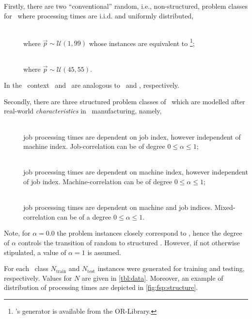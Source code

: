 Firstly, there are two ``conventional'' random, i.e., non-structured, problem classes for \FSP\  where processing times are i.i.d. and uniformly distributed, 
\begin{description}
	\item[\Frnd]   \hfill \\
	where $\vec{p}\sim\mathcal{U}(1,99)$ whose instances are equivalent to \cite{Taillard1993}\footnote{\citeauthor{Taillard1993}'s generator is available from the OR-Library.};
	\item[\Frndn]   \hfill \\
	where $\vec{p}\sim\mathcal{U}(45,55)$.
\end{description}
In the \JSP\ context \ and \ are analogous to \ and , respectively.  


Secondly, there are three structured problem classes of \FSP\  which are modelled after real-world \emph{characteristics} in \fsp\ manufacturing, namely, 
\begin{description}
	\item[\Fjc]  \hfill \\
	job processing times are dependent on job index, however independent of machine index. Job-correlation can be of degree $0\leq\alpha\leq1$;
	\item[\Fmc]   \hfill \\
	job processing times are dependent on machine index, however independent of job index. Machine-correlation can be of degree $0\leq\alpha\leq1$; 
	\item[\Fmxc]   \hfill \\
	job processing times are dependent on machine and job indices. Mixed-correlation can be of a degree $0\leq\alpha\leq1$.
\end{description} 
Note, for $\alpha=0.0$ the problem instances closely correspond to , hence the degree of $\alpha$ controls the transition of random to structured \FSP. However, if not otherwise stipulated, a value of $\alpha=1$ is assumed.

For each \FSP\  class $N_{\text{train}}$  and $N_{\text{test}}$ instances were generated for training and testing, respectively. Values for $N$ are given in \cref{tbl:data}. Moreover, an example of distribution of processing times are depicted in \cref{fig:fsp:structure}.



